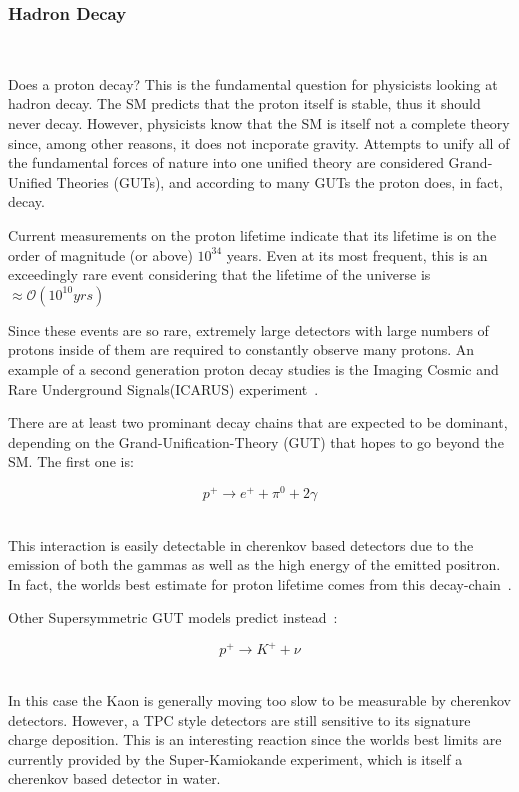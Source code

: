 \subsubsection{Hadron Decay}~\label{sec:hadron_decay}

Does a proton decay?
This is the fundamental question for physicists looking at hadron decay.
The SM predicts that the proton itself is stable, thus it should never decay.
However, physicists know that the SM is itself not a complete theory since, among other reasons, it does not incporate gravity.
Attempts to unify all of the fundamental forces of nature into one unified theory are considered Grand-Unified Theories (GUTs), and according to many GUTs the proton does, in fact, decay.

Current measurements on the proton lifetime indicate that its lifetime is on the order of magnitude (or above) $10^{34}$ years.
Even at its most frequent, this is an exceedingly rare event considering that the lifetime of the universe is $\approx \mathcal{O}(10^{10} yrs)$

Since these events are so rare, extremely large detectors with large numbers of protons inside of them are required to constantly observe many protons.
An example of a second generation proton decay studies is the Imaging Cosmic and Rare Underground Signals(ICARUS) experiment~\citep{ICARUS_2001}.

There are at least two prominant decay chains that are expected to be dominant, depending on the Grand-Unification-Theory (GUT) that hopes to go beyond the SM.
The first one is:

\begin{equation}
  p^{+} \rightarrow e^{+} + \pi^{0} + 2 \gamma
\end{equation}
~\label{eq:rxn_proton_decay1}

This interaction is easily detectable in cherenkov based detectors due to the emission of both the gammas as well as the high energy of the emitted positron.
In fact, the worlds best estimate for proton lifetime comes from this decay-chain~\citep{PhysRevD.95.012004}.

Other Supersymmetric GUT models predict instead~\citep{PhysRevD.38.1479}:

\begin{equation}
  p^{+} \rightarrow K^{+} + \nu
\end{equation}
~\label{eq:rxn_proton_decay2}

In this case the Kaon is generally moving too slow to be measurable by cherenkov detectors.
However, a TPC style detectors are still sensitive to its signature charge deposition.
This is an interesting reaction since the worlds best limits are currently provided by the Super-Kamiokande experiment, which is itself a cherenkov based detector in water.

